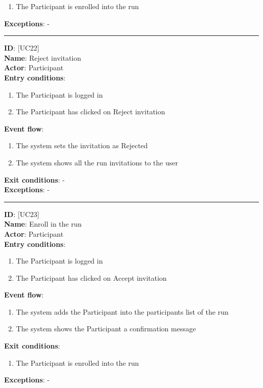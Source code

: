 \documentclass[12pt]{report}
\newcommand\usecase[1]{ [UC#1] }
\begin{document}
\begin{itemize}
\begin{enumerate}
    			\item{The Participant is enrolled into the run}
  		\end{enumerate}
  	\textbf{Exceptions}: - \\
  	\rule{\linewidth}{0.4pt}
  	\textbf{ID}: \usecase{22} \\
  	\textbf{Name}: Reject invitation \\
    \textbf{Actor}: Participant \\
    \textbf{Entry conditions}: 
    		\begin{enumerate}
    			\item{The Participant is logged in}
    			\item{The Participant has clicked on Reject invitation}
    		\end{enumerate}
  	\textbf{Event flow}:
  		\begin{enumerate}
    			\item{The system sets the invitation as Rejected}
    			\item{The system shows all the run invitations to the user}
  		\end{enumerate}
  	\textbf{Exit conditions}: - \\
  	\textbf{Exceptions}: - \\
  	\rule{\linewidth}{0.4pt}
  	\textbf{ID}: \usecase{23} \\
  	\textbf{Name}: Enroll in the run \\
    \textbf{Actor}: Participant \\
    \textbf{Entry conditions}: 
    		\begin{enumerate}
    			\item{The Participant is logged in}
    			\item{The Participant has clicked on Accept invitation}
    		\end{enumerate}
  	\textbf{Event flow}:
  		\begin{enumerate}
    			\item{The system adds the Participant into the participants list of the run}
    			\item{The system shows the Participant a confirmation message}
  		\end{enumerate}
  	\textbf{Exit conditions}:
  		\begin{enumerate}
    			\item{The Participant is enrolled into the run}
  		\end{enumerate}
  	\textbf{Exceptions}: - \\

\end{itemize}
\end{document}
